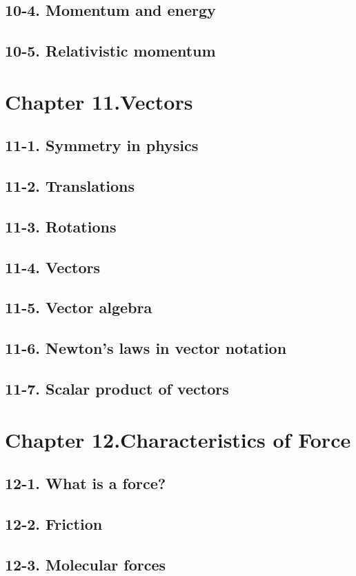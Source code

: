 \documentclass{article}
\begin{document}
\subsection{10-4. Momentum and energy}
\subsection{10-5. Relativistic momentum}
\section{Chapter 11.Vectors}
\subsection{11-1. Symmetry in physics}
\subsection{11-2. Translations}
\subsection{11-3. Rotations}
\subsection{11-4. Vectors}
\subsection{11-5. Vector algebra}
\subsection{11-6. Newton’s laws in vector notation}
\subsection{11-7. Scalar product of vectors}
\section{Chapter 12.Characteristics of Force}
\subsection{12-1. What is a force?}
\subsection{12-2. Friction}
\subsection{12-3. Molecular forces}
\end{document}
